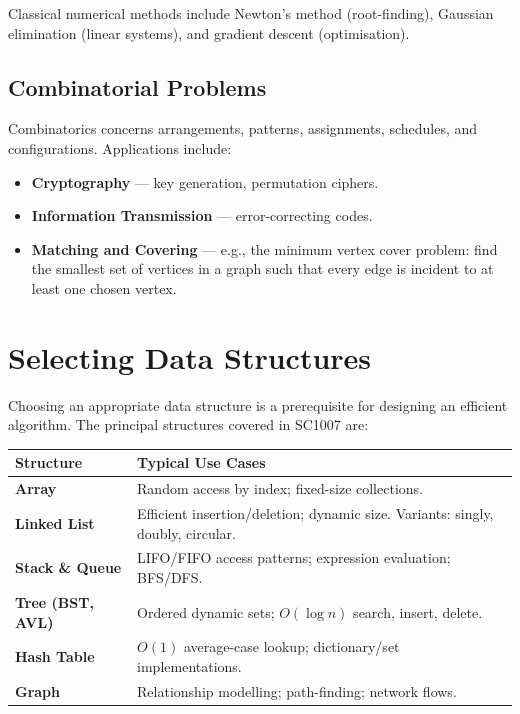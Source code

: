 \documentclass[11pt, a4paper, notitlepage]{report}
\theoremstyle{definition}
\theoremstyle{remark}
\theoremstyle{definition}
\begin{document}
Classical numerical methods include Newton's method (root-finding), Gaussian elimination
(linear systems), and gradient descent (optimisation).

\subsection{Combinatorial Problems}
\label{subsec:combinatorial-problems}

Combinatorics concerns arrangements, patterns, assignments, schedules, and configurations.
Applications include:
\begin{itemize}
  \item \textbf{Cryptography} --- key generation, permutation ciphers.
  \item \textbf{Information Transmission} --- error-correcting codes.
  \item \textbf{Matching and Covering} --- e.g., the minimum vertex cover problem: find the
        smallest set of vertices in a graph such that every edge is incident to at least one
        chosen vertex.
\end{itemize}

\section{Selecting Data Structures}
\label{sec:data-structures-overview}

Choosing an appropriate data structure is a prerequisite for designing an efficient algorithm.
The principal structures covered in SC1007 are:

\begin{center}
\begin{tabularx}{\linewidth}{@{}>{\bfseries}lX@{}}
\toprule
Structure & Typical Use Cases \\
\midrule
Array & Random access by index; fixed-size collections. \\
Linked List & Efficient insertion/deletion; dynamic size. Variants: singly, doubly,
              circular. \\
Stack \& Queue & LIFO/FIFO access patterns; expression evaluation; BFS/DFS. \\
Tree (BST, AVL) & Ordered dynamic sets; $O(\log n)$ search, insert, delete. \\
Hash Table & $O(1)$ average-case lookup; dictionary/set implementations. \\
Graph & Relationship modelling; path-finding; network flows. \\
\bottomrule
\end{tabularx}
\end{center}
\end{document}
